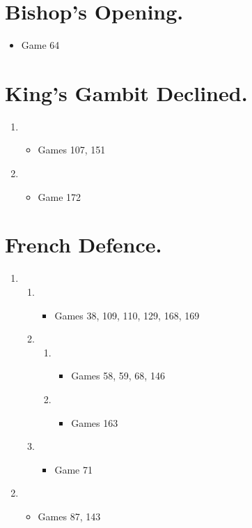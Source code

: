 \section{Bishop's Opening.}
\newgame{}
\begin{itemize}
\item Game 64
\end{itemize}

\section{King's Gambit Declined.}
\newgame{}
\begin{enumerate}
\item {}
\begin{itemize}
\item Games 107, 151
\end{itemize}
\item {}
\begin{itemize}
\item Game 172
\end{itemize}
\end{enumerate}

\section{French Defence.}
\newgame{}
\begin{enumerate}
\item {}
\begin{enumerate}
\item {}
\begin{itemize}
\item Games 38, 109, 110, 129, 168, 169
\end{itemize}
\item {}
\begin{enumerate}
\item {}
\begin{itemize}
\item Games 58, 59, 68, 146
\end{itemize}
\item {}
\begin{itemize}
\item Games 163
\end{itemize}
\end{enumerate}
\item {}
\begin{itemize}
\item Game 71
\end{itemize}
\end{enumerate}
\item {}
\begin{itemize}
\item Games 87, 143
\end{itemize}
\end{enumerate}

